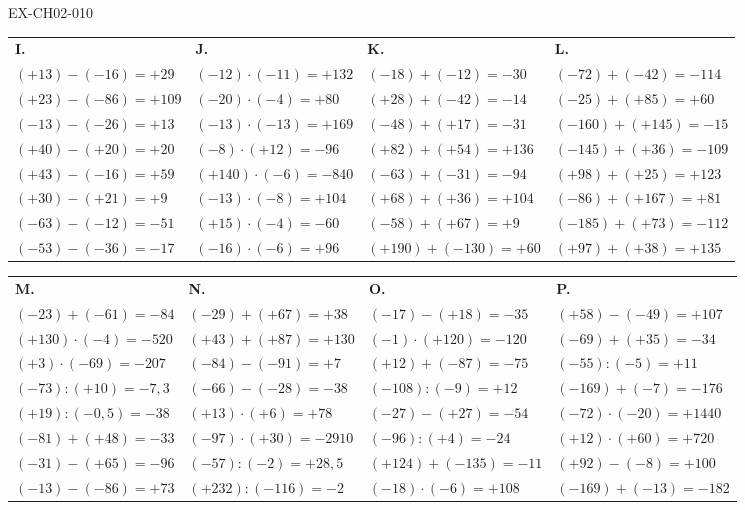 \begin{solution}{EX-CH02-010}
\bigskip
\begin{tabularx}{\linewidth}{*{4}{X}}
\textbf{I.} & \textbf{J.} & \textbf{K.} & \textbf{L.} \\
$(+13)-(-16)=+29$ & $(-12)\cdot(-11)=+132$ & $(-18)+(-12)=-30$ & $(-72)+(-42)=-114$ \\
$(+23)-(-86)=+109$ & $(-20)\cdot(-4)=+80$ & $(+28)+(-42)=-14$ & $(-25)+(+85)=+60$ \\
$(-13)-(-26)=+13$ & $(-13)\cdot(-13)=+169$ & $(-48)+(+17)=-31$ & $(-160)+(+145)=-15$ \\
$(+40)-(+20)=+20$ & $(-8)\cdot(+12)=-96$ & $(+82)+(+54)=+136$ & $(-145)+(+36)=-109$ \\
$(+43)-(-16)=+59$ & $(+140)\cdot(-6)=-840$ & $(-63)+(-31)=-94$ & $(+98)+(+25)=+123$ \\
$(+30)-(+21)=+9$ & $(-13)\cdot(-8)=+104$ & $(+68)+(+36)=+104$ & $(-86)+(+167)=+81$ \\
$(-63)-(-12)=-51$ & $(+15)\cdot(-4)=-60$ & $(-58)+(+67)=+9$ & $(-185)+(+73)=-112$ \\
$(-53)-(-36)=-17$ & $(-16)\cdot(-6)=+96$ & $(+190)+(-130)=+60$ & $(+97)+(+38)=+135$ \\
\end{tabularx}

\bigskip
\begin{tabularx}{\linewidth}{*{4}{X}}
\textbf{M.} & \textbf{N.} & \textbf{O.} & \textbf{P.} \\
$(-23)+(-61)=-84$ & $(-29)+(+67)=+38$ & $(-17)-(+18)=-35$ & $(+58)-(-49)=+107$ \\
$(+130)\cdot(-4)=-520$ & $(+43)+(+87)=+130$ & $(-1)\cdot(+120)=-120$ & $(-69)+(+35)=-34$ \\
$(+3)\cdot(-69)=-207$ & $(-84)-(-91)=+7$ & $(+12)+(-87)=-75$ & $(-55):(-5)=+11$ \\
$(-73):(+10)=-7{,}3$ & $(-66)-(-28)=-38$ & $(-108):(-9)=+12$ & $(-169)+(-7)=-176$ \\
$(+19):(-0{,}5)=-38$ & $(+13)\cdot(+6)=+78$ & $(-27)-(+27)=-54$ & $(-72)\cdot(-20)=+1440$ \\
$(-81)+(+48)=-33$ & $(-97)\cdot(+30)=-2910$ & $(-96):(+4)=-24$ & $(+12)\cdot(+60)=+720$ \\
$(-31)-(+65)=-96$ & $(-57):(-2)=+28{,}5$ & $(+124)+(-135)=-11$ & $(+92)-(-8)=+100$ \\
$(-13)-(-86)=+73$ & $(+232):(-116)=-2$ & $(-18)\cdot(-6)=+108$ & $(-169)+(-13)=-182$ \\
\end{tabularx}

\end{solution}